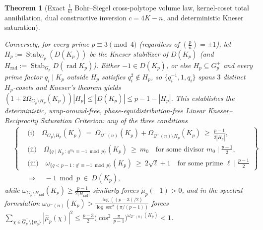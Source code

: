 \documentclass[11pt, a4paper]{article}
\theoremstyle{plain}
\newtheorem{theorem}{Theorem}[section]
\theoremstyle{definition}
\newcommand{\leg}[2]{\left(\frac{#1}{#2}\right)}
\begin{document}
\begin{theorem}[Exact $\frac{1}{k!}$ Bohr--Siegel cross-polytope volume law, kernel-coset total annihilation, dual constructive inversion $c=4K-n$, and deterministic Kneser saturation]
\begin{enumerate}[(a)]
    Conversely, for \emph{every} prime $p\equiv3\pmod 4$ (regardless of $\leg{p}{n}=\pm1$), let $H_p:=\allowbreak\operatorname{Stab}_{G_p}(\allowbreak D(K_p))$ be the Kneser stabilizer of $D(K_p)$ (and $H_{\mathrm{rad}}:=\operatorname{Stab}_{G_p}D(\operatorname{rad}K_p)$). Either $-1\in D(K_p)$, or else $H_p\subseteq G_p^{+}$ and every prime factor $q_i\mid K_p$ outside $H_p$ satisfies $q_i^{2}\notin H_p$, so $\{q_i^{-1},1,q_i\}$ spans $3$ distinct $H_p$-cosets and Kneser's theorem yields $(1+2\Omega_{G_p\setminus H_p}(K_p))|H_p|\le|D(K_p)|\le p-1-|H_p|$. This establishes the \emph{deterministic, wrap-around-free, phase-equidistribution-free Linear Kneser--Reciprocity Saturation Criterion}: any of the three conditions
    \begin{equation}\label{eq:linear_kneser_reciprocity_saturation}
    \begin{split}
    &\left\{\begin{aligned}
    &\text{(i)}\quad \Omega_{G_p\setminus H_p}(K_p)\ =\ \Omega_{\mathcal{Q}^{-}(n)}(K_p)+\Omega_{\mathcal{Q}^{+}(n)\setminus H_p}(K_p)\ \ge\ \frac{p-1}{2|H_p|},\\[3pt]
    &\text{(ii)}\quad \Omega_{\{q\mid K_p\,:\,q^{m_0}\equiv-1\bmod p\}}(K_p)\ \ge\ m_0\quad\text{for some divisor }m_0\mid\frac{p-1}{2},\\[3pt]
    &\text{(iii)}\quad \omega_{\{q<p-1\,:\,q^{\ell}\equiv-1\bmod p\}}(K_p)\ \ge\ 2\sqrt{\ell}+1\quad\text{for some prime }\ell\mid\frac{p-1}{2}
    \end{aligned}\right\}\\
    &\qquad\Longrightarrow\quad -1\bmod p\ \in\ D(K_p),
    \end{split}
    \end{equation}
    while $\omega_{G_p\setminus H_{\mathrm{rad}}}(K_p)\ge\frac{p-1}{2|H_{\mathrm{rad}}|}$ similarly forces $\widetilde{\mu}_p(-1)>0$, and in the spectral formulation $\omega_{\mathcal{Q}^{-}(n)}(K_p)>\frac{\log((p-3)/2)}{\log\sec^{2}(\pi/(p-1))}$ forces $\sum_{\chi\in\widehat{G}_p^{-}\setminus\{\psi_0\}}|\widehat{\mu}_p(\chi)|^{2}\le\frac{p-3}{2}\big(\cos^{2}\frac{\pi}{p-1}\big)^{\omega_{\mathcal{Q}^{-}(n)}(K_p)}<1$.


\end{enumerate}
\end{theorem}
\end{document}
